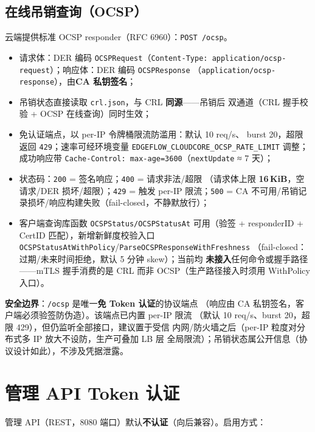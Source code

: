 \subsection{在线吊销查询（OCSP）}

云端提供标准 OCSP responder（RFC 6960）：\texttt{POST /ocsp}。

\begin{itemize}
  \item 请求体：DER 编码 \texttt{OCSPRequest}（\texttt{Content-Type:
        application/ocsp-request}）；响应体：DER 编码 \texttt{OCSPResponse}
        （\texttt{application/ocsp-response}），由\textbf{CA 私钥签名}；
  \item 吊销状态直接读取 \texttt{crl.json}，与 CRL \textbf{同源}——吊销后
        双通道（CRL 握手校验 + OCSP 在线查询）同时生效；
  \item 免认证端点，以 per-IP 令牌桶限流防滥用：默认 10 req/s、
        burst 20，超限返回 \texttt{429}；速率可经环境变量
        \texttt{EDGEFLOW\_CLOUDCORE\_OCSP\_RATE\_LIMIT} 调整；成功响应带
        \texttt{Cache-Control: max-age=3600}（\texttt{nextUpdate} ≈ 7 天）；
  \item 状态码：\texttt{200} = 签名响应；\texttt{400} = 请求非法/超限
        （请求体上限 \textbf{16\,KiB}，空请求/DER 损坏/超限）；\texttt{429} =
        触发 per-IP 限流；\texttt{500} =
        CA 不可用/吊销记录损坏/响应构建失败（fail-closed，不静默放行）；
  \item 客户端查询库函数 \texttt{OCSPStatus/OCSPStatusAt} 可用（验签 +
        responderID + CertID 匹配），新增新鲜度校验入口
        \texttt{OCSPStatusAtWithPolicy}/\texttt{ParseOCSPResponseWithFreshness}
        （fail-closed：过期/未来时间拒绝，默认 5 分钟 skew）；当前均
        \textbf{未接入}任何命令或握手路径——mTLS 握手消费的是 CRL 而非
        OCSP（生产路径接入时须用 WithPolicy 入口）。
\end{itemize}

\textbf{安全边界}：\texttt{/ocsp} 是唯一\textbf{免 Token 认证}的协议端点
（响应由 CA 私钥签名，客户端必须验签防伪造）。该端点已内置 per-IP 限流
（默认 10 req/s、burst 20，超限 429），但仍监听全部接口，建议置于受信
内网/防火墙之后（per-IP 粒度对分布式多 IP 放大不设防，生产可叠加 LB 层
全局限流）；吊销状态属公开信息（协议设计如此），不涉及凭据泄露。

\section{管理 API Token 认证}

管理 API（REST，8080 端口）默认\textbf{不认证}（向后兼容）。启用方式：

